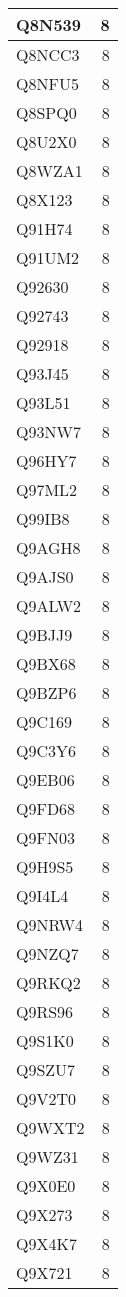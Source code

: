 \documentclass[
]{book}
\theoremstyle{definition}
\theoremstyle{definition}
\theoremstyle{definition}
\theoremstyle{definition}
\theoremstyle{remark}
\begin{document}
\begin{table}
\begin{tabular}{l|r}
\hline
Q8N539 & 8\\
\hline
Q8NCC3 & 8\\
\hline
Q8NFU5 & 8\\
\hline
Q8SPQ0 & 8\\
\hline
Q8U2X0 & 8\\
\hline
Q8WZA1 & 8\\
\hline
Q8X123 & 8\\
\hline
Q91H74 & 8\\
\hline
Q91UM2 & 8\\
\hline
Q92630 & 8\\
\hline
Q92743 & 8\\
\hline
Q92918 & 8\\
\hline
Q93J45 & 8\\
\hline
Q93L51 & 8\\
\hline
Q93NW7 & 8\\
\hline
Q96HY7 & 8\\
\hline
Q97ML2 & 8\\
\hline
Q99IB8 & 8\\
\hline
Q9AGH8 & 8\\
\hline
Q9AJS0 & 8\\
\hline
Q9ALW2 & 8\\
\hline
Q9BJJ9 & 8\\
\hline
Q9BX68 & 8\\
\hline
Q9BZP6 & 8\\
\hline
Q9C169 & 8\\
\hline
Q9C3Y6 & 8\\
\hline
Q9EB06 & 8\\
\hline
Q9FD68 & 8\\
\hline
Q9FN03 & 8\\
\hline
Q9H9S5 & 8\\
\hline
Q9I4L4 & 8\\
\hline
Q9NRW4 & 8\\
\hline
Q9NZQ7 & 8\\
\hline
Q9RKQ2 & 8\\
\hline
Q9RS96 & 8\\
\hline
Q9S1K0 & 8\\
\hline
Q9SZU7 & 8\\
\hline
Q9V2T0 & 8\\
\hline
Q9WXT2 & 8\\
\hline
Q9WZ31 & 8\\
\hline
Q9X0E0 & 8\\
\hline
Q9X273 & 8\\
\hline
Q9X4K7 & 8\\
\hline
Q9X721 & 8\\

\end{tabular}
\end{table}
\end{document}
